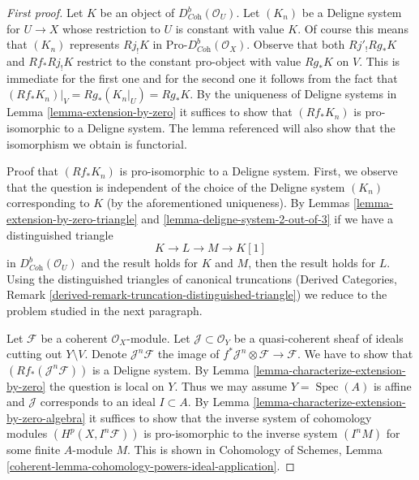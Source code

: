 \documentclass[10pt,a4paper]{amsart}
\theoremstyle{plain}
\theoremstyle{definition}
\theoremstyle{remark}
\numberwithin{equation}{subsection}
\def\Spec{\mathop{\mathrm{Spec}}}
\begin{document}
\begin{proof}[First proof]
Let $K$ be an object of $D^b_{\textit{Coh}}(\mathcal{O}_U)$. Let $(K_n)$
be a Deligne system for $U \to X$ whose restriction to $U$ is constant
with value $K$. Of course this means that $(K_n)$ represents $Rj_!K$
in $\text{Pro-}D^b_{\textit{Coh}}(\mathcal{O}_X)$. Observe that
both $Rj'_!Rg_*K$ and $Rf_*Rj_!K$ restrict to the constant pro-object with
value $Rg_*K$ on $V$. This is immediate for the first one and for the second
one it follows from the fact that $(Rf_*K_n)|_V = Rg_*(K_n|_U) = Rg_*K$.
By the uniqueness of Deligne systems in Lemma \ref{lemma-extension-by-zero}
it suffices to show that $(Rf_*K_n)$ is pro-isomorphic to a
Deligne system. The lemma referenced will also show that the
isomorphism we obtain is functorial.

\medskip\noindent
Proof that $(Rf_*K_n)$ is pro-isomorphic to a Deligne system.
First, we observe that the question is independent of the choice
of the Deligne system $(K_n)$ corresponding to $K$ (by the aforementioned
uniqueness). By Lemmas \ref{lemma-extension-by-zero-triangle} and
\ref{lemma-deligne-system-2-out-of-3}
if we have a distinguished triangle
$$
K \to L \to M \to K[1]
$$
in $D^b_{\textit{Coh}}(\mathcal{O}_U)$ and the result holds for
$K$ and $M$, then the result holds for $L$. Using the distinguished
triangles of canonical truncations (Derived Categories, Remark
\ref{derived-remark-truncation-distinguished-triangle})
we reduce to the problem studied in the next paragraph.

\medskip\noindent
Let $\mathcal{F}$ be a coherent $\mathcal{O}_X$-module.
Let $\mathcal{J} \subset \mathcal{O}_Y$ be a quasi-coherent
sheaf of ideals cutting out $Y \setminus V$. Denote
$\mathcal{J}^n\mathcal{F}$ the image of
$f^*\mathcal{J}^n \otimes \mathcal{F} \to \mathcal{F}$.
We have to show that $(Rf_*(\mathcal{J}^n\mathcal{F}))$
is a Deligne system. By Lemma \ref{lemma-characterize-extension-by-zero}
the question is local on $Y$. Thus we may assume $Y = \Spec(A)$ is affine
and $\mathcal{J}$ corresponds to an ideal $I \subset A$. By
Lemma \ref{lemma-characterize-extension-by-zero-algebra}
it suffices to show that the inverse system of cohomology modules
$(H^p(X, I^n\mathcal{F}))$ is pro-isomorphic to the inverse system
$(I^n M)$ for some finite $A$-module $M$.
This is shown in Cohomology of Schemes, Lemma
\ref{coherent-lemma-cohomology-powers-ideal-application}.
\end{proof}
\end{document}
